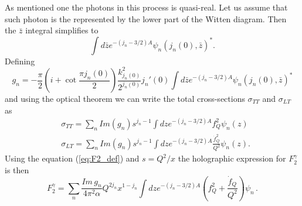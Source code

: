 \documentclass[preprint, 12pt]{elsarticle}
\begin{document}
As mentioned one the photons in this process is quasi-real. Let us assume that such photon is the represented by the lower part of the Witten diagram. Then the $\bar{z}$ integral simplifies to 
\begin{equation}
\int d\bar{z} e^{- \left(j_n - 3/2\right) A} {\psi_n \left(j_n\left(0\right), \bar{z}\right)}^{*}.
\end{equation}
Defining
\begin{equation}
g_n = - \frac{\pi}{2} \left( i + \cot \frac{\pi j_n\left(0\right)}{2} \right) \frac{k^2_{j_n\left(0\right)}}{2^{j_n\left(0\right)}} j_n'\left(0\right) \int d\bar{z} e^{- \left(j_n - 3/2\right) A} {\psi_n \left(j_n\left(0\right), \bar{z}\right)}^*
\end{equation}
and using the optical theorem we can write the total cross-sections $\sigma_{TT}$ and $\sigma_{LT}$ as
\begin{align}
&\sigma_{TT} =  \sum_n Im\left(g_n\right) s^{j_n - 1} \int dz e^{-\left(j_n - 3/2\right) A} f_Q^2 \psi_n\left(z\right) \\
&\sigma_{LT} =  \sum_n  Im\left(g_n\right) s^{j_n - 1} \int dz e^{-\left(j_n - 3/2\right) A} \frac{\dot{f}_Q^2}{Q^2} \psi_n\left(z\right).
\end{align}
Using the equation (\ref{eq:F2_def}) and $s  = Q^2 / x$ the holographic expression for $F_2^\gamma$ is then
\begin{equation}
F_2^\gamma = \sum_n \frac{ Im \, g_n}{4 \pi^2 \alpha} Q^{2 j_n} x^{1- j_n} \int dz e^{- \left( j_n - 3/2\right) A} \left( f_Q^2 + \frac{\dot{f}_Q}{Q^2} \right) \psi_n \,.
\end{equation}


\end{document}
